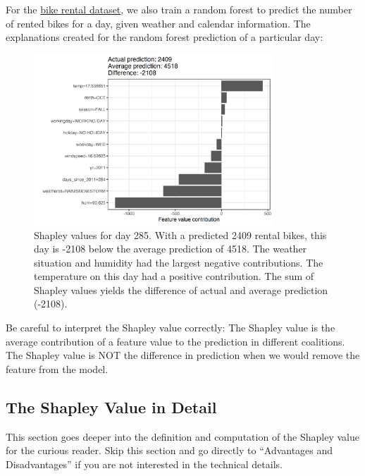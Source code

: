 \documentclass[
  11pt,
]{scrbook}
\begin{document}
For the \protect\hyperlink{bike-data}{bike rental dataset}, we also train a random forest to predict the number of rented bikes for a day, given weather and calendar information.
The explanations created for the random forest prediction of a particular day:

\begin{figure}

{\centering \includegraphics[width=0.8\textwidth]{images/shapley-bike-plot-1} 

}

\caption{Shapley values for day 285. With a predicted 2409 rental bikes, this day is -2108 below the average prediction of 4518. The weather situation and humidity had the largest negative contributions. The temperature on this day had a positive contribution. The sum of Shapley values yields the difference of actual and average prediction (-2108).}\label{fig:shapley-bike-plot}
\end{figure}

Be careful to interpret the Shapley value correctly:
The Shapley value is the average contribution of a feature value to the prediction in different coalitions.
The Shapley value is NOT the difference in prediction when we would remove the feature from the model.

\hypertarget{the-shapley-value-in-detail}{%
\subsection{The Shapley Value in Detail}\label{the-shapley-value-in-detail}}

This section goes deeper into the definition and computation of the Shapley value for the curious reader.
Skip this section and go directly to ``Advantages and Disadvantages'' if you are not interested in the technical details.
\end{document}
